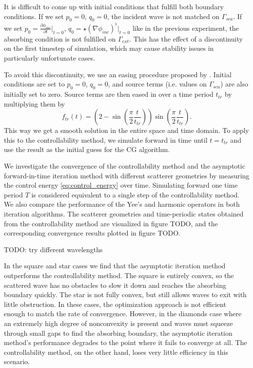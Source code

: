 \documentclass[utf8,english]{gradu3}
\begin{document}
It is difficult to come up with initial conditions
that fulfill both boundary conditions. 
If we set $p_0 = 0$, $q_0 = 0$, the incident wave is not matched on $\Gamma_{sca}$.
If we set $p_0 = \frac{\partial \phi_{inc}}{\partial t} \Big|_{t=0}$,
$q_0 = \star (\nabla \phi_{inc})^{\flat} \Big|_{t=0}$
like in the previous experiment, the absorbing condition
is not fulfilled on $\Gamma_{ext}$.
This has the effect of a discontinuity on the first timestep of simulation,
which may cause stability issues in particularly unfortunate cases.

To avoid this discontinuity, we use an easing procedure
proposed by \textcite{mur_finite-element_1993}.
Initial conditions are set to $p_0 = 0$, $q_0 = 0$,
and source terms (i.e. values on $\Gamma_{sca}$)
are also initially set to zero.
Source terms are then eased in over a time period $t_{tr}$
by multiplying them by
\begin{equation}\label{eq:mur_transition}
  f_{tr}(t) = (2 - \sin(\frac{\pi}{2} \frac{t}{t_{tr}}))\sin(\frac{\pi}{2} \frac{t}{t_{tr}}).
\end{equation}
This way we get a smooth solution in the entire space and time domain.
To apply this to the controllability method,
we simulate forward in time until $t = t_{tr}$
and use the result as the initial guess for the CG algorithm.

We investigate the convergence of the controllability method
and the asymptotic forward-in-time iteration method
with different scatterer geometries
by measuring the control energy \eqref{eq:control_energy} over time.
Simulating forward one time period $T$ is considered equivalent
to a single step of the controllability method.
We also compare the performance of the Yee's and harmonic operators
in both iteration algorithms.
The scatterer geometries and time-periodic states
obtained from the controllability method are visualized in figure TODO,
and the corresponding convergence results plotted in figure TODO.

TODO: try different wavelengths

In the square and star cases we find that the asymptotic iteration method
outperforms the controllability method.
The square is entirely convex, so the scattered wave has no obstacles to slow it down
and reaches the absorbing boundary quickly.
The star is not fully convex, but still allows waves to exit with little obstruction.
In these cases, the optimization approach is not efficient enough
to match the rate of convergence.
However, in the diamonds case where an extremely high degree of nonconvexity is present
and waves must squeeze through small gaps to find the absorbing boundary,
the asymptotic iteration method's performance degrades
to the point where it fails to converge at all.
The controllability method, on the other hand,
loses very little efficiency in this scenario.
\end{document}
